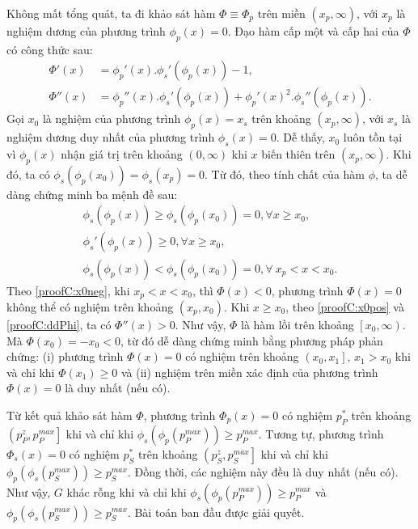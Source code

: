 \documentclass[../main.tex]{subfiles}
\begin{document}
Không mất tổng quát, ta đi khảo sát hàm $\Phi \equiv \Phi_p$ trên miền $\left(x_p, \infty\right)$, với $x_p$ là nghiệm dương của phương trình $\phi_p(x)=0$. Đạo hàm cấp một và cấp hai của $\Phi$ có công thức sau:
\begin{subequations}\label{proofC:dPhi}
\begin{align}
\Phi'(x) &= \phi_p'(x).\phi_s'(\phi_p(x)) - 1,  \\
\Phi''(x) &= \phi_p''(x).\phi_s'(\phi_p(x)) 
+ \phi_p'(x)^2.\phi_s''(\phi_p(x)). \label{proofC:ddPhi}
\end{align}
\end{subequations}
Gọi $x_0$ là nghiệm của phương trình $\phi_p(x) = x_s$ trên khoảng $\left(x_{p}, \infty\right)$, với $x_s$ là nghiệm dương duy nhất của phương trình $\phi_s(x)=0$. Dễ thấy, $x_0$ luôn tồn tại vì $\phi_p(x)$ nhận giá trị trên khoảng $\left(0, \infty\right)$ khi $x$ biến thiên trên $\left(x_{p}, \infty\right)$. Khi đó, ta có $\phi_s(\phi_p(x_0)) = \phi_s(x_p) = 0$. Từ đó, theo tính chất của hàm $\phi$, ta dễ dàng chứng minh ba mệnh đề sau:
\begin{subequations}
\begin{align}
\phi_s(\phi_p(x)) \geq \phi_s(\phi_p(x_0)) = 0, \forall x \geq x_0, \\
\phi_s'(\phi_p(x)) \geq 0, \forall x \geq x_0, \label{proofC:x0pos} \\
\phi_s(\phi_p(x)) < \phi_s(\phi_p(x_0)) = 0, \forall \ x_{p} < x < x_0. \label{proofC:x0neg}
\end{align}
\end{subequations}
Theo \eqref{proofC:x0neg}, khi $x_{p} < x < x_0$, thì $\Phi(x) < 0$, phương trình $\Phi(x) = 0$ không thể có nghiệm trên khoảng $\left(x_{p}, x_0\right)$. Khi $x \geq x_0$, theo \eqref{proofC:x0pos} và \eqref{proofC:ddPhi}, ta có $\Phi''(x) > 0$. Như vậy, $\Phi$ là hàm lồi trên khoảng $\left[x_0, \infty\right)$. Mà $\Phi(x_0)=-x_0 < 0$, từ đó dễ dàng chứng minh bằng phương pháp phản chứng: (i) phương trình $\Phi(x) = 0$ có nghiệm trên khoảng $\left(x_0, x_1\right]$, $x_1 > x_0$ khi và chỉ khi $\Phi(x_1) \geq 0$ và (ii) nghiệm trên miền xác định của phương trình $\Phi(x) = 0$ là duy nhất (nếu có).

Từ kết quả khảo sát hàm $\Phi$, phương trình $\Phi_p(x)=0$ có nghiệm $p_P^*$ trên khoảng $\left(p_P^z, p_P^{max}\right]$ khi và chỉ khi $\phi_s(\phi_p(p_P^{max})) \geq p_P^{max}$. Tương tự, phương trình $\Phi_s(x)=0$ có nghiệm $p_S^*$ trên khoảng $\left(p_S^z, p_S^{max}\right]$ khi và chỉ khi $\phi_p(\phi_s(p_S^{max})) \geq p_S^{max}$. Đồng thời, các nghiệm này đều là duy nhất (nếu có). Như vậy, $G$ khác rỗng khi và chỉ khi $\phi_s(\phi_p(p_P^{max})) \geq p_P^{max}$ và $\phi_p(\phi_s(p_S^{max})) \geq p_S^{max}$. Bài toán ban đầu được giải quyết.
\end{document}
